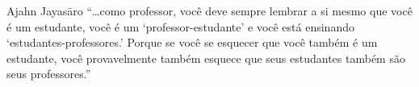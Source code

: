 
\begin{quotepage}{0.53\linewidth}{Ajahn Jayasāro}
“\ldots{}como professor, você deve sempre lembrar a si mesmo que você é um
estudante, você é um ‘professor-estudante’ e você está ensinando
‘estudantes-professores.’ Porque se você se esquecer que você também é
um estudante, você provavelmente também esquece que seus estudantes
também são seus professores.”
\end{quotepage}


